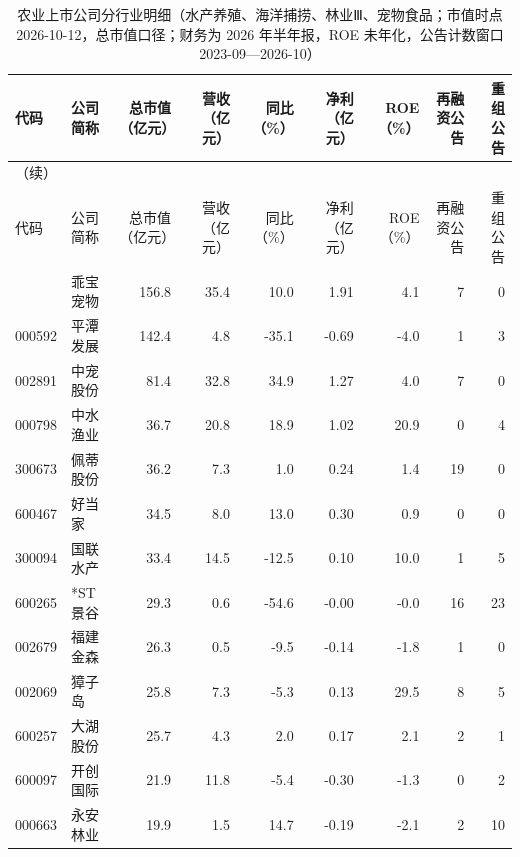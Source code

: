 \begingroup\scriptsize\setlength{\tabcolsep}{2pt}
\begin{longtable}{@{}llrrrrrrr@{}}
\caption{农业上市公司分行业明细（水产养殖、海洋捕捞、林业Ⅲ、宠物食品；市值时点 2026-10-12，总市值口径；财务为 2026 年半年报，ROE 未年化，公告计数窗口 2023-09---2026-10）}\label{tab:comp-fishery}\\
\toprule
代码 & 公司简称 & 总市值（亿元） & 营收（亿元） & 同比（\%） & 净利（亿元） & ROE（\%） & 再融资公告 & 重组公告 \\
\midrule
\endfirsthead
\multicolumn{9}{l}{\small（续）}\\
\toprule
代码 & 公司简称 & 总市值（亿元） & 营收（亿元） & 同比（\%） & 净利（亿元） & ROE（\%） & 再融资公告 & 重组公告 \\
\midrule
\endhead
\bottomrule
\endlastfoot
301498 & 乖宝宠物 & 156.8 & 35.4 & 10.0 & 1.91 & 4.1 & 7 & 0 \\
000592 & 平潭发展 & 142.4 & 4.8 & -35.1 & -0.69 & -4.0 & 1 & 3 \\
002891 & 中宠股份 & 81.4 & 32.8 & 34.9 & 1.27 & 4.0 & 7 & 0 \\
000798 & 中水渔业 & 36.7 & 20.8 & 18.9 & 1.02 & 20.9 & 0 & 4 \\
300673 & 佩蒂股份 & 36.2 & 7.3 & 1.0 & 0.24 & 1.4 & 19 & 0 \\
600467 & 好当家 & 34.5 & 8.0 & 13.0 & 0.30 & 0.9 & 0 & 0 \\
300094 & 国联水产 & 33.4 & 14.5 & -12.5 & 0.10 & 10.0 & 1 & 5 \\
600265 & *ST景谷 & 29.3 & 0.6 & -54.6 & -0.00 & -0.0 & 16 & 23 \\
002679 & 福建金森 & 26.3 & 0.5 & -9.5 & -0.14 & -1.8 & 1 & 0 \\
002069 & 獐子岛 & 25.8 & 7.3 & -5.3 & 0.13 & 29.5 & 8 & 5 \\
600257 & 大湖股份 & 25.7 & 4.3 & 2.0 & 0.17 & 2.1 & 2 & 1 \\
600097 & 开创国际 & 21.9 & 11.8 & -5.4 & -0.30 & -1.3 & 0 & 2 \\
000663 & 永安林业 & 19.9 & 1.5 & 14.7 & -0.19 & -2.1 & 2 & 10 \\
\end{longtable}
\endgroup
